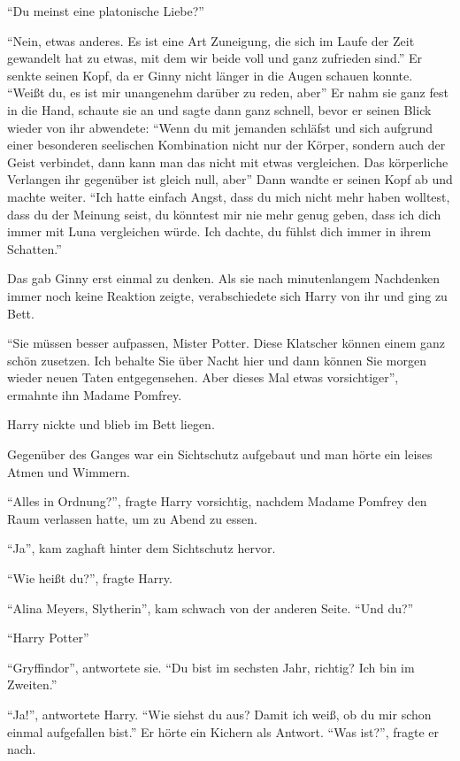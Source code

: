 \enquote{Du meinst eine platonische Liebe?}

\enquote{Nein, etwas anderes. Es ist eine Art Zuneigung, die sich im Laufe der Zeit gewandelt hat zu etwas, mit dem wir beide voll und ganz zufrieden sind.} Er senkte seinen Kopf, da er Ginny nicht länger in die Augen schauen konnte. \enquote{Weißt du, es ist mir unangenehm darüber zu reden, aber\abs} Er nahm sie ganz fest in die Hand, schaute sie an und sagte dann ganz schnell, bevor er seinen Blick wieder von ihr abwendete: \enquote{Wenn du mit jemanden schläfst und sich aufgrund einer besonderen seelischen Kombination nicht nur der Körper, sondern auch der Geist verbindet, dann kann man das nicht mit etwas vergleichen. Das körperliche Verlangen ihr gegenüber ist gleich null, aber\abs} Dann wandte er seinen Kopf ab und machte weiter. \enquote{Ich hatte einfach Angst, dass du mich nicht mehr haben wolltest, dass du der Meinung seist, du könntest mir nie mehr genug geben, dass ich dich immer mit Luna vergleichen würde. Ich dachte, du fühlst dich immer in ihrem Schatten.}

Das gab Ginny erst einmal zu denken. Als sie nach minutenlangem Nachdenken immer noch keine Reaktion zeigte, verabschiedete sich Harry von ihr und ging zu Bett.

\trenn

\enquote{Sie müssen besser aufpassen, Mister Potter. Diese Klatscher können einem ganz schön zusetzen. Ich behalte Sie über Nacht hier und dann können Sie morgen wieder neuen Taten entgegensehen. \gst Aber dieses Mal etwas vorsichtiger}, ermahnte ihn Madame Pomfrey.

Harry nickte und blieb im Bett liegen.

Gegenüber des Ganges war ein Sichtschutz aufgebaut und man hörte ein leises Atmen und Wimmern.

\enquote{Alles in Ordnung?}, fragte Harry vorsichtig, nachdem Madame Pomfrey den Raum verlassen hatte, um zu Abend zu essen.

\enquote{Ja}, kam zaghaft hinter dem Sichtschutz hervor.

\enquote{Wie heißt du?}, fragte Harry.

\enquote{Alina Meyers, Slytherin}, kam schwach von der anderen Seite. \enquote{Und du?}

\enquote{Harry Potter\abs}

\enquote{Gryffindor}, antwortete sie. \enquote{Du bist im sechsten Jahr, richtig? Ich bin im Zweiten.}

\enquote{Ja!}, antwortete Harry. \enquote{Wie siehst du aus? Damit ich weiß, ob du mir schon einmal aufgefallen bist.} Er hörte ein Kichern als Antwort. \enquote{Was ist?}, fragte er nach.

